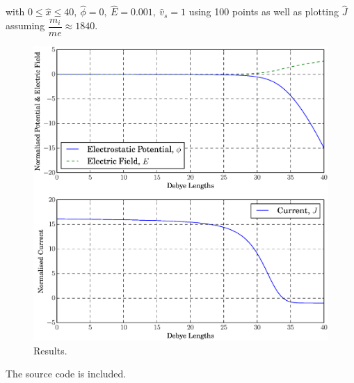 \documentclass[10pt,a4paper]{article}
\begin{document}
	with $0 \leq \hat{x} \leq 40,~\hat{\phi} = 0,~\hat{E} = 0.001,~\hat{v}_{s} = 1$ using 100 points as well as plotting $\hat{J}$ assuming $\dfrac{m_{i}}{m{e}} \approx 1840$.
	\begin{figure}
		\includegraphics[width=\textwidth]{debye.eps}
		\caption{Results.}\label{fig:results}
	\end{figure}
	The source code is included.
	\inputminted[linenos = true,
				 breaklines, 
				 breakanywhere]{python}{assignment1.py}
\end{document}
